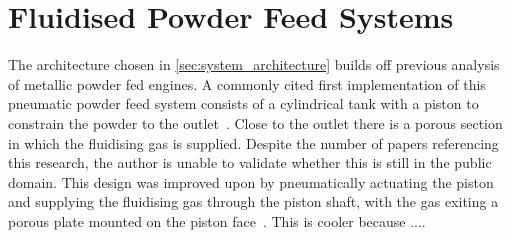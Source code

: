 


\section{Fluidised Powder Feed Systems}
The architecture chosen in \autoref{sec:system_architecture} builds off previous analysis of metallic powder fed engines. A commonly cited first implementation of this pneumatic powder feed system consists of a cylindrical tank with a piston to constrain the powder to the outlet~\cite{LI2021712}. Close to the outlet there is a porous section in which the fluidising gas is supplied. Despite the number of papers referencing this research, the author is unable to validate whether this is still in the public domain. This design was improved upon by pneumatically actuating the piston and supplying the fluidising gas through the piston shaft, with the gas exiting a porous plate mounted on the piston face~\cite{Loftus1972}. This is cooler because ....


